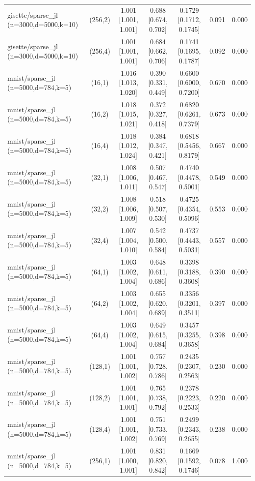 \begin{tabular}{lcccccc}
gisette/sparse\_jl (n=3000,d=5000,k=10) & (256,2) & 1.001 [1.001, 1.001] & 0.688 [0.674, 0.702] & 0.1729 [0.1712, 0.1745] & 0.091 & 0.000 \\
gisette/sparse\_jl (n=3000,d=5000,k=10) & (256,4) & 1.001 [1.001, 1.001] & 0.684 [0.662, 0.706] & 0.1741 [0.1695, 0.1787] & 0.092 & 0.000 \\
mnist/sparse\_jl (n=5000,d=784,k=5) & (16,1) & 1.016 [1.013, 1.020] & 0.390 [0.331, 0.449] & 0.6600 [0.6000, 0.7200] & 0.670 & 0.000 \\
mnist/sparse\_jl (n=5000,d=784,k=5) & (16,2) & 1.018 [1.015, 1.021] & 0.372 [0.327, 0.418] & 0.6820 [0.6261, 0.7379] & 0.673 & 0.000 \\
mnist/sparse\_jl (n=5000,d=784,k=5) & (16,4) & 1.018 [1.012, 1.024] & 0.384 [0.347, 0.421] & 0.6818 [0.5456, 0.8179] & 0.667 & 0.000 \\
mnist/sparse\_jl (n=5000,d=784,k=5) & (32,1) & 1.008 [1.006, 1.011] & 0.507 [0.467, 0.547] & 0.4740 [0.4478, 0.5001] & 0.549 & 0.000 \\
mnist/sparse\_jl (n=5000,d=784,k=5) & (32,2) & 1.008 [1.006, 1.009] & 0.518 [0.507, 0.530] & 0.4725 [0.4354, 0.5096] & 0.553 & 0.000 \\
mnist/sparse\_jl (n=5000,d=784,k=5) & (32,4) & 1.007 [1.004, 1.010] & 0.542 [0.500, 0.584] & 0.4737 [0.4443, 0.5031] & 0.557 & 0.000 \\
mnist/sparse\_jl (n=5000,d=784,k=5) & (64,1) & 1.003 [1.002, 1.004] & 0.648 [0.611, 0.686] & 0.3398 [0.3188, 0.3608] & 0.390 & 0.000 \\
mnist/sparse\_jl (n=5000,d=784,k=5) & (64,2) & 1.003 [1.002, 1.004] & 0.655 [0.620, 0.689] & 0.3356 [0.3201, 0.3511] & 0.397 & 0.000 \\
mnist/sparse\_jl (n=5000,d=784,k=5) & (64,4) & 1.003 [1.002, 1.004] & 0.649 [0.615, 0.684] & 0.3457 [0.3255, 0.3658] & 0.398 & 0.000 \\
mnist/sparse\_jl (n=5000,d=784,k=5) & (128,1) & 1.001 [1.001, 1.002] & 0.757 [0.728, 0.786] & 0.2435 [0.2307, 0.2563] & 0.230 & 0.000 \\
mnist/sparse\_jl (n=5000,d=784,k=5) & (128,2) & 1.001 [1.001, 1.001] & 0.765 [0.738, 0.792] & 0.2378 [0.2223, 0.2533] & 0.220 & 0.000 \\
mnist/sparse\_jl (n=5000,d=784,k=5) & (128,4) & 1.001 [1.001, 1.002] & 0.751 [0.733, 0.769] & 0.2499 [0.2343, 0.2655] & 0.238 & 0.000 \\
mnist/sparse\_jl (n=5000,d=784,k=5) & (256,1) & 1.001 [1.000, 1.001] & 0.831 [0.820, 0.842] & 0.1669 [0.1592, 0.1746] & 0.078 & 1.000 \\

\end{tabular}
